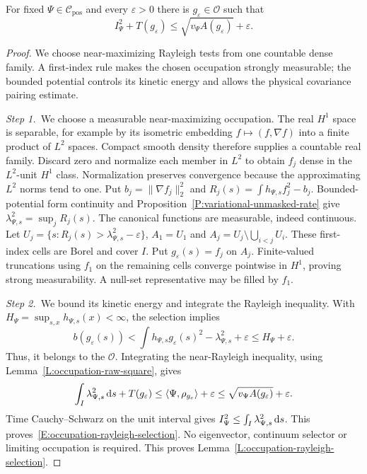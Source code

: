\begin{lemma}
  \label{L:occupation-rayleigh-selection}
  For fixed $\Psi \in \mathcal{C}_{\mathrm{pos}}$ and every $\varepsilon > 0$
  there is $g_\varepsilon \in \mathcal{O}$ such that
  \begin{equation}\label{E:occupation-rayleigh-selection}
    I_\Psi^2+T(g_\varepsilon)
    \le\sqrt{v_\Psi A(g_\varepsilon)}+\varepsilon .
  \end{equation}
\end{lemma}

\begin{proof}
  We choose near-maximizing Rayleigh tests from one countable dense family. A
  first-index rule makes the chosen occupation strongly measurable; the
  bounded potential controls its kinetic energy and allows the physical
  covariance pairing estimate.


  \medskip
  \noindent\textit{Step 1.~}We choose a measurable near-maximizing occupation.
  The real $H^1$ space is separable, for example by its isometric embedding
  $f\mapsto(f,\nabla f)$ into a finite product of $L^2$ spaces. Compact smooth
  density therefore supplies a countable real family. Discard zero and normalize
  each member in $L^2$ to obtain $f_j$ dense in the $L^2$-unit $H^1$ class.
  Normalization preserves convergence because the approximating $L^2$ norms tend
  to one. Put $b_j = \|\nabla f_j\|_2^2$ and $R_j(s) = \int
  h_{\Psi,s}f_j^2-b_j$. Bounded-potential form continuity and
  Proposition~\ref{P:variational-unmasked-rate} give $\lambda_{\Psi,s}^2 =
  \sup_jR_j(s)$. The canonical functions are measurable, indeed continuous. Let
  $U_j = \{s:R_j(s)>\lambda_{\Psi,s}^2-\varepsilon\}$, $A_1 = U_1$ and $A_j =
  U_j\setminus\bigcup_{i<j}U_i$. These first-index cells are Borel and cover
  $I$. Put $g_\varepsilon(s) = f_j$ on $A_j$. Finite-valued truncations using
  $f_1$ on the remaining cells converge pointwise in $H^1$, proving strong
  measurability. A null-set representative may be filled by $f_1$.


  \medskip
  \noindent\textit{Step 2.~}We bound its kinetic energy and integrate the
  Rayleigh inequality.
  With $H_\Psi = \sup_{s,x}h_{\Psi,s}(x) < \infty$, the selection implies
  \[
    b(g_\varepsilon(s))
    <\int h_{\Psi,s}g_\varepsilon(s)^2-\lambda_{\Psi,s}^2+\varepsilon
    \le H_\Psi+\varepsilon .
  \]
  Thus, it belongs to the $\mathcal{O}$. Integrating the near-Rayleigh
  inequality, using Lemma~\ref{L:occupation-raw-square}, gives
  \[
    \int_I\lambda_{\Psi,s}^2\,\mathrm{d} s+T(g_\varepsilon)
    \le\langle\Psi,\rho_{g_\varepsilon}\rangle+\varepsilon
    \le\sqrt{v_\Psi A(g_\varepsilon)}+\varepsilon .
  \]
  Time Cauchy--Schwarz on the unit interval gives $I_\Psi^2 \le
  \int_I\lambda_{\Psi,s}^2\,\mathrm{d} s$. This
  proves~\eqref{E:occupation-rayleigh-selection}. No eigenvector, continuum
  selector or limiting occupation is required. This proves
  Lemma~\ref{L:occupation-rayleigh-selection}.
\end{proof}

